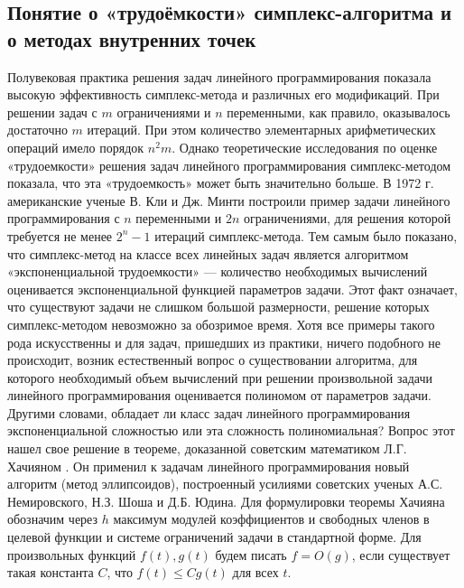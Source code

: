 \subsection{Понятие о «трудоёмкости» симплекс-алгоритма и о методах внутренних точек}
Полувековая практика решения задач линейного программирования показала высокую эффективность симплекс-метода и различных его модификаций. При решении задач с $m$ ограничениями и $n$ переменными, как правило, оказывалось достаточно $m$ итераций. При этом количество элементарных арифметических операций имело порядок $n^2m$. Однако теоретические исследования по оценке «трудоемкости» решения задач линейного программирования симплекс-методом показала, что эта «трудоемкость» может быть значительно больше. В 1972 г. американские ученые В. Кли и Дж. Минти построили пример задачи линейного программирования с $n$ переменными и $2n$ ограничениями, для решения которой требуется не менее $2^n - 1$ итераций симплекс-метода. Тем самым было показано, что симплекс-метод на классе всех линейных задач является алгоритмом «экспоненциальной трудоемкости» — количество необходимых вычислений оценивается экспоненциальной функцией параметров задачи. Этот факт означает, что существуют задачи не слишком большой размерности, решение которых симплекс-методом невозможно за обозримое время. Хотя все примеры такого рода искусственны и для задач, пришедших из практики, ничего подобного не происходит, возник естественный вопрос о существовании алгоритма, для которого необходимый объем вычислений при решении произвольной задачи линейного программирования оценивается полиномом от параметров задачи. Другими словами, обладает ли класс задач линейного программирования экспоненциальной сложностью или эта сложность полиномиальная? Вопрос этот нашел свое решение в теореме, доказанной советским математиком Л.Г. Хачияном \cite{literature_hachiyan}.
 Он применил к задачам линейного программирования новый алгоритм (метод эллипсоидов), построенный усилиями советских ученых А.С. Немировского, Н.З. Шоша и Д.Б. Юдина. Для формулировки теоремы Хачияна обозначим через $h$ максимум модулей коэффициентов и свободных членов в целевой функции и системе ограничений задачи в стандартной форме. Для произвольных функций $f(t), g(t)$ будем писать $f = O(g)$, если существует такая константа $C$, что $f(t) \leq C g(t)$ для всех $t$.
